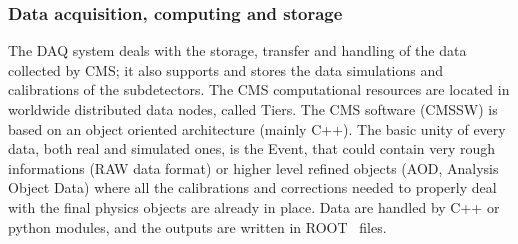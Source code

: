 \subsubsection{Data acquisition, computing and storage}
The DAQ system deals with the storage, transfer and handling of the data collected by CMS; it also supports and stores the data simulations and calibrations of the subdetectors. The CMS computational resources are located in worldwide distributed data nodes, called Tiers. The CMS software (CMSSW) is based on an object oriented architecture (mainly C++). The basic unity of every data, both real and simulated ones, is the Event, that could contain very rough informations (RAW data format) or higher level refined objects (AOD, Analysis Object Data) where all the calibrations and corrections needed to properly deal with the final physics objects are already in place. Data are handled by C++ or python modules, and the outputs are written in ROOT~\cite{Brun:1997pa} files.

